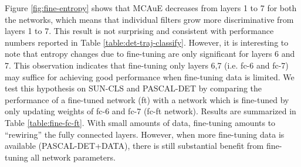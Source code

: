 Figure \ref{fig:fine-entropy} shows that MCAuE decreases from layers 1 to 7 for both the networks, which means that individual filters grow more discriminative from layers 1 to 7.
This result is not surprising and consistent with performance numbers reported in Table \ref{table:det-traj-classify}. 
However, it is interesting to note that entropy changes due to fine-tuning are only significant for layers 6 and 7. 
This observation indicates that fine-tuning only layers 6,7 (i.e. fc-6 and fc-7) may suffice for achieving good performance when fine-tuning data is limited. 
We test this hypothesis on SUN-CLS and PASCAL-DET by comparing the performance of a fine-tuned network (ft) with a network which is fine-tuned by only updating weights of fc-6 and fc-7 (fc-ft network). 
Results are summarized in Table \ref{table:fine-fc-ft}.
With small amounts of data, fine-tuning amounts to ``rewiring'' the fully connected layers.
However, when more fine-tuning data is available (PASCAL-DET+DATA), there is still substantial benefit from fine-tuning all network parameters.

\setlength{\tabcolsep}{2pt}
\begin{table}[t!]
\begin{center}
\caption{Comparison in performance when fine-tuning the entire network (ft) versus only fine-tuning the fully-connected layers (fc-ft).}
\label{table:fine-fc-ft}
\vspace{0.3em}
\end{center}
\end{table}
\setlength{\tabcolsep}{1.4pt}


